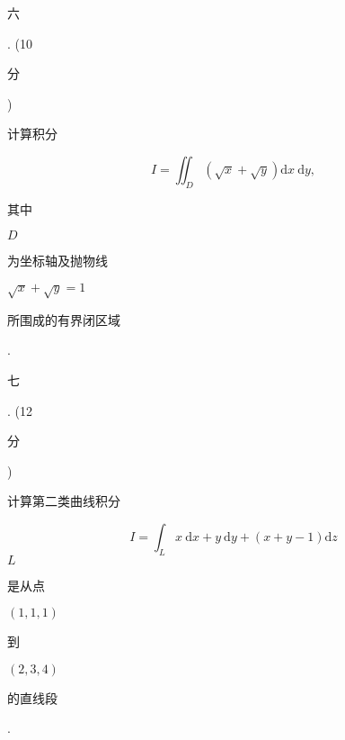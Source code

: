 \documentclass[10pt]{article}
\begin{document}
\begin{CJK}{UTF8}{mj}六\end{CJK}. (10 \begin{CJK}{UTF8}{mj}分\end{CJK}) \begin{CJK}{UTF8}{mj}计算积分\end{CJK}
$$
I=\iint_{D}(\sqrt{x}+\sqrt{y}) \mathrm{d} x \mathrm{~d} y,
$$
\begin{CJK}{UTF8}{mj}其中\end{CJK} $D$ \begin{CJK}{UTF8}{mj}为坐标轴及抛物线\end{CJK} $\sqrt{x}+\sqrt{y}=1$ \begin{CJK}{UTF8}{mj}所围成的有界闭区域\end{CJK}.

\begin{CJK}{UTF8}{mj}七\end{CJK}. (12 \begin{CJK}{UTF8}{mj}分\end{CJK}) \begin{CJK}{UTF8}{mj}计算第二类曲线积分\end{CJK}
$$
I=\int_{L} x \mathrm{~d} x+y \mathrm{~d} y+(x+y-1) \mathrm{d} z
$$
$L$ \begin{CJK}{UTF8}{mj}是从点\end{CJK} $(1,1,1)$ \begin{CJK}{UTF8}{mj}到\end{CJK} $(2,3,4)$ \begin{CJK}{UTF8}{mj}的直线段\end{CJK}.
\end{document}
